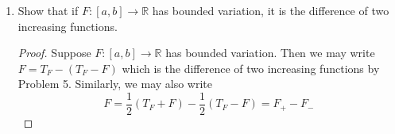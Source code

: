 \documentclass[11pt,oneside,english]{amsart}
\theoremstyle{definition}
\newcommand{\ve}{\varepsilon}
\newcommand{\MB}[1]{\mathbb{#1}}
\begin{document}
\begin{enumerate}
\begin{proof}
Next, since $F$ is of bounded variation and $T_F$ is an increasing function, the total variation of $F$ on any interval $[x_{i-1},x_i]$ is greater than or equal to the net change of $F$ on that interval, i.e.
\[
T_F(x_i)-T_F(x_{i-1})=|T_F(x_i)-T_F(x_{i-1}|\geq|F(x_i)-F(x_{i-1})|\geq F(x_i)-F(x_{i-1}),\text{ whence}
\]
\[
T_F(x_i)-F(x_i)\geq T_F(x_{i-1})-F(x_{i-1}).
\]
Therefore $T_F-F$ is an increasing function by definition. To show that $T_F+F$ is an increasing function, let $\ve>0$, let $x,y\in[a,b]$ with $x<y$, and by the characterization of supremum we may choose a partition of $[a,x]\subseteq[a,b]$ such that
\[
\sum_{j=1}^n|F(x_j)-F(x_{j-1})|\geq T_F(x)-\ve.
\]

Now, $\sum_{j=1}^n|F(x_j)-F(x_{j-1})|+|F(y)-F(x)|$ is also greater than $T_F-\ve$, and $|F(y)-F(x)|\geq F(y)-F(x)$, so
\begin{align*}
T_F(y) +F(y)&\geq\sum_{i=1}^n|F(x_i)+F(x_{i-1})|+|F(y)-F(x)|+F(y)\\[2mm]
&\geq\sum_{i=1}^n|F(x_i)+F(x_{i-1})|+F(y)-F(x)+F(x)\\[2mm]
&\geq T_F(x)-\ve +F(x).
\end{align*}

Since $\ve$ is arbitrary, it follows that $T_f(y)+F(y)\geq T_F(x)+F(x)$, i.e. $T_F+F$ is increasing.
\end{proof}

%
%


\item Show that if $F:[a,b]\rightarrow \MB{R}$ has bounded variation, it is the difference of two increasing functions.

\begin{proof}
Suppose $F:[a,b]\rightarrow \MB{R}$ has bounded variation. Then we may write $F=T_F-(T_F-F)$ which is the difference of two increasing functions by Problem 5. Similarly, we may also write 
\[
F=\frac{1}{2}(T_F+F)-\frac{1}{2}(T_F-F)=F_+-F_-
\]
\end{proof}



\end{enumerate}
\end{document}
